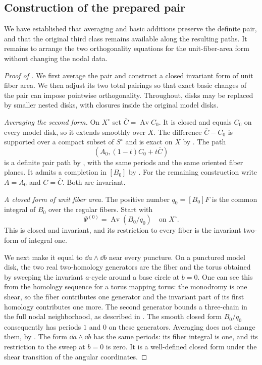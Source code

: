 \subsection{Construction of the prepared pair}

We have established that averaging and basic additions preserve the
definite pair, and that the original third class remains available
along the resulting paths.  It remains to arrange the two orthogonality
equations for the unit-fiber-area form without changing the nodal data.

\begin{proof}[Proof of ]
We first average the pair and construct a closed invariant form of
unit fiber area.  We then adjust its two total pairings so that exact
basic changes of the pair can impose pointwise orthogonality.
Throughout, disks may be replaced by smaller nested disks, with
closures inside the original model disks.

\emph{Averaging the second form.}
On $X^\circ$ set $\overline C=\operatorname{Av}C_0$.  It is closed
and equals $C_0$ on every model disk, so it extends smoothly over $X$.
The difference $\overline C-C_0$ is supported over a compact subset
of $S^\circ$ and is exact on $X$ by
.  The path
\[
 (A_0,(1-t)C_0+t\overline C)
\]
is a definite pair path by , with the same
periods and the same oriented fiber planes.  It admits a completion in
$[B_0]$ by .  For the remaining construction
write $A=A_0$ and $C=\overline C$.  Both are invariant.

\emph{A closed form of unit fiber area.}
The positive number $q_0=[B_0]F$ is the common integral of $B_0$ over
the regular fibers.  Start with
\[
 \Psi^{(0)}=\operatorname{Av}(B_0/q_0)
 \quad\text{on }X^\circ.
\]
This is closed and invariant, and its restriction to every fiber is
the invariant two-form of integral one.

We next make it equal to $\dd a\wedge\dd b$ near every puncture.
On a punctured model disk, the two real two-homology generators are
the fiber and the torus obtained by sweeping the invariant $a$-cycle
around a base circle at $b=0$.  One can see this from the homology
sequence for a torus mapping torus: the monodromy is one shear, so
the fiber contributes one generator and the invariant part of its
first homology contributes one more.  The second generator bounds a
three-chain in the full nodal neighborhood, as described in
.  The smooth closed form $B_0/q_0$ consequently
has periods $1$ and $0$ on these generators.  Averaging does not change
them, by .  The form
$\dd a\wedge\dd b$ has the same periods: its fiber integral is one,
and its restriction to the sweep at $b=0$ is zero.  It is a well-defined
closed form under the shear transition of the angular coordinates.


\end{proof}
